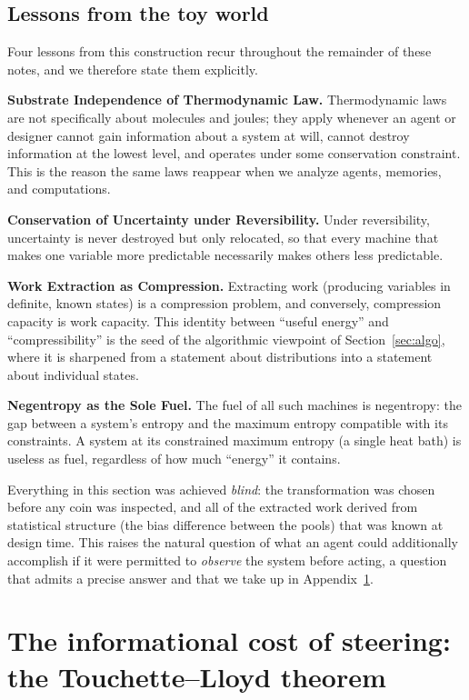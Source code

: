 \documentclass[11pt]{article}
\begin{document}
\subsection{Lessons from the toy world}
\label{sec:cointeach}

Four lessons from this construction recur throughout the remainder of these notes, and we therefore state them explicitly.

\textbf{Substrate Independence of Thermodynamic Law.} Thermodynamic laws are not specifically about molecules and joules; they apply whenever an agent or designer cannot gain information about a system at will, cannot destroy information at the lowest level, and operates under some conservation constraint. This is the reason the same laws reappear when we analyze agents, memories, and computations.

\textbf{Conservation of Uncertainty under Reversibility.} Under reversibility, uncertainty is never destroyed but only relocated, so that every machine that makes one variable more predictable necessarily makes others less predictable.

\textbf{Work Extraction as Compression.} Extracting work (producing variables in definite, known states) is a compression problem, and conversely, compression capacity is work capacity. This identity between ``useful energy'' and ``compressibility'' is the seed of the algorithmic viewpoint of Section~\ref{sec:algo}, where it is sharpened from a statement about distributions into a statement about individual states.

\textbf{Negentropy as the Sole Fuel.} The fuel of all such machines is negentropy: the gap between a system's entropy and the maximum entropy compatible with its constraints. A system at its constrained maximum entropy (a single heat bath) is useless as fuel, regardless of how much ``energy'' it contains.

Everything in this section was achieved \emph{blind}: the transformation was chosen before any coin was inspected, and all of the extracted work derived from statistical structure (the bias difference between the pools) that was known at design time. This raises the natural question of what an agent could additionally accomplish if it were permitted to \emph{observe} the system before acting, a question that admits a precise answer and that we take up in Appendix~\ref{sec:tl}.
\section{The informational cost of steering: the Touchette--Lloyd theorem}
\label{sec:tl}
\end{document}
